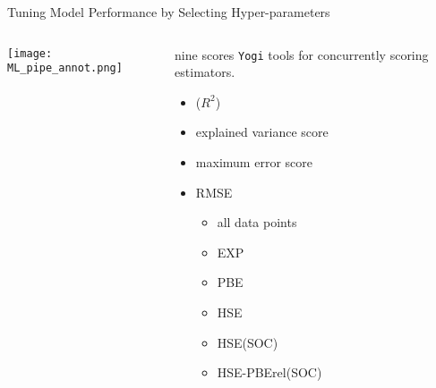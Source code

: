 \documentclass[10pt, aspectratio=169, presentation]{beamer}
\begin{document}
\begin{frame}[label={sec:org09b4d28},fragile]{Tuning Model Performance by Selecting Hyper-parameters}
 \begin{columns}
\begin{column}{0.7\columnwidth}
\begin{center}
\texttt{[image: ML\_pipe\_annot.png]}
\end{center}
\end{column}

\begin{column}{0.3\columnwidth}
\begin{block}{nine scores}
\texttt{Yogi} tools for concurrently scoring estimators.
\autocite{manganaris-2022-mrs-comput}
\begin{itemize}
\item (\(R^2\))
\item explained variance score
\item maximum error score
\item RMSE
\begin{itemize}
\item all data points
\item EXP
\item PBE
\item HSE
\item HSE(SOC)
\item HSE-PBErel(SOC)
\end{itemize}
\end{itemize}
\end{block}
\end{column}
\end{columns}
\end{frame}
\end{document}

